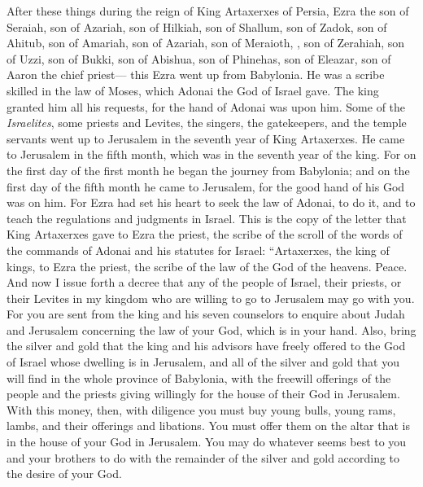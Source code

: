 \begin{biblechapter} %
 After these things during the reign of King Artaxerxes of Persia, Ezra the son of Seraiah, son of Azariah, son of Hilkiah,
\verse son of Shallum, son of Zadok, son of Ahitub,
\verse son of Amariah, son of Azariah, son of Meraioth,
\verse , son of Zerahiah, son of Uzzi, son of Bukki,
\verse son of Abishua, son of Phinehas, son of Eleazar, son of Aaron the chief priest—
\verse this Ezra went up from Babylonia. He was a scribe skilled in the law of Moses, which Adonai the God of Israel gave. The king granted him all his requests, for the hand of Adonai was upon him.
\verse Some of the \textit{Israelites}, some priests and Levites, the singers, the gatekeepers, and the temple servants went up to Jerusalem in the seventh year of King Artaxerxes.
\verse He came to Jerusalem in the fifth month, which was in the seventh year of the king.
\verse For on the first day of the first month he began the journey from Babylonia; and on the first day of the fifth month he came to Jerusalem, for the good hand of his God was on him.
\verse For Ezra had set his heart to seek the law of Adonai, to do it, and to teach the regulations and judgments in Israel.
 This is the copy of the letter that King Artaxerxes gave to Ezra the priest, the scribe of the scroll of the words of the commands of Adonai and his statutes for Israel:
\verse “Artaxerxes, the king of kings, to Ezra the priest, the scribe of the law of the God of the heavens. Peace. And now
\verse I issue forth a decree that any of the people of Israel, their priests, or their Levites in my kingdom who are willing to go to Jerusalem may go with you.
\verse For you are sent from the king and his seven counselors to enquire about Judah and Jerusalem concerning the law of your God, which is in your hand.
\verse Also, bring the silver and gold that the king and his advisors have freely offered to the God of Israel whose dwelling is in Jerusalem,
\verse and all of the silver and gold that you will find in the whole province of Babylonia, with the freewill offerings of the people and the priests giving willingly for the house of their God in Jerusalem.
\verse With this money, then, with diligence you must buy young bulls, young rams, lambs, and their offerings and libations. You must offer them on the altar that is in the house of your God in Jerusalem.
\verse You may do whatever seems best to you and your brothers to do with the remainder of the silver and gold according to the desire of your God.

\end{biblechapter}

